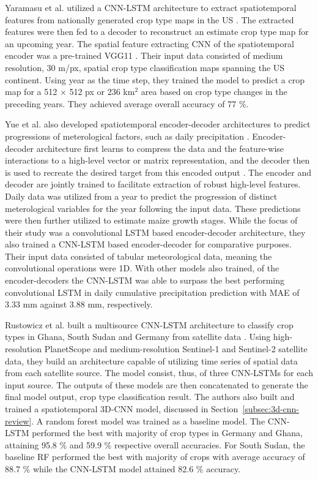 Yaramasu et al. utilized a CNN-LSTM architecture to extract spatiotemporal features from nationally generated crop type maps in the US \cite{Yaramasu2020}. The extracted features were then fed to a decoder to reconstruct an estimate crop type map for an upcoming year. The spatial feature extracting CNN of the spatiotemporal encoder was a pre-trained VGG11 \cite{Simonyan2015}. Their input data consisted of medium resolution, 30 m/px, spatial crop type classification maps spanning the US continent. Using year as the time step, they trained the model to predict a crop map for a 512 $\times$ 512 px or 236 km$^2$ area based on crop type changes in the preceding years. They achieved average overall accuracy of 77 \%.

Yue et al. also developed spatiotemporal encoder-decoder architectures to predict progressions of meterological factors, such as daily precipitation \cite{Yue2020}. Encoder-decoder architecture first learns to compress the data and the feature-wise interactions to a high-level vector or matrix representation, and the decoder then is used to recreate the desired target from this encoded output \cite{Vincent2008}. The encoder and decoder are jointly trained to facilitate extraction of robust high-level features. Daily data was utilized from a year to predict the progression of distinct meterological variables for the year following the input data. These predictions were then further utilized to estimate maize growth stages. While the focus of their study was a convolutional LSTM based encoder-decoder architecture, they also trained a CNN-LSTM based encoder-decoder for comparative purposes. Their input data consisted of tabular meteorological data, meaning the convolutional operations were 1D. With other models also trained, of the encoder-decoders the CNN-LSTM was able to surpass the best performing convolutional LSTM in daily cumulative precipitation prediction with MAE of 3.33 mm against 3.88 mm, respectively.

Rustowicz et al. built a multisource CNN-LSTM architecture to classify crop types in Ghana, South Sudan and Germany from satellite data \cite{Rustowicz2019}. Using high-resolution PlanetScope and medium-resolution Sentinel-1 and Sentinel-2 satellite data, they build an architecture capable of utilizing time series of spatial data from each satellite source. The model consist, thus, of three CNN-LSTMs for each input source. The outputs of these models are then concatenated to generate the final model output, crop type classification result. The authors also built and trained a spatiotemporal 3D-CNN model, discussed in Section~\ref{subsec:3d-cnn-review}. A random forest model was trained as a baseline model. The CNN-LSTM performed the best with majority of crop types in Germany and Ghana, attaining 95.8 \% and 59.9 \% respective overall accuracies. For South Sudan, the baseline RF performed the best with majority of crops with average accuracy of 88.7 \% while the CNN-LSTM model attained 82.6 \% accuracy.

